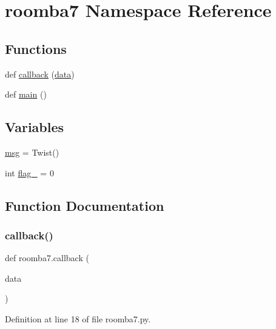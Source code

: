 \hypertarget{namespaceroomba7}{}\section{roomba7 Namespace Reference}
\label{namespaceroomba7}
\subsection*{Functions}
\begin{DoxyCompactItemize}
\item 
def \mbox{\hyperlink{namespaceroomba7_a2398476e4adc7e6e8c7d12904a24617d}{callback}} (\mbox{\hyperlink{structdata}{data}})
\item 
def \mbox{\hyperlink{namespaceroomba7_a7fc50351870e6b71242de8eaf321f8c5}{main}} ()
\end{DoxyCompactItemize}
\subsection*{Variables}
\begin{DoxyCompactItemize}
\item 
\mbox{\hyperlink{namespaceroomba7_afc2fb6a41aa7cf1f7bb1ea383afb3ce8}{msg}} = Twist()
\item 
int \mbox{\hyperlink{namespaceroomba7_ab53f4dccb94d2309d6b647417b978941}{flag\+\_}} = 0
\end{DoxyCompactItemize}


\subsection{Function Documentation}
\mbox{\label{namespaceroomba7_a2398476e4adc7e6e8c7d12904a24617d}} 
\subsubsection{\texorpdfstring{callback()}{callback()}}
{\footnotesize\ttfamily def roomba7.\+callback (\begin{DoxyParamCaption}\item[{}]{data }\end{DoxyParamCaption})}



Definition at line 18 of file roomba7.\+py.

\mbox{\label{namespaceroomba7_a7fc50351870e6b71242de8eaf321f8c5}} 

